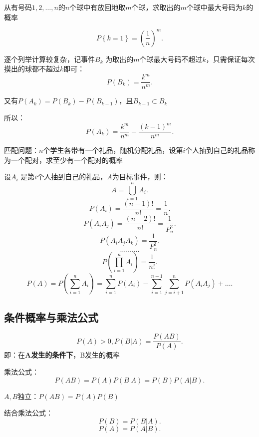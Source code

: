 \begin{eg}
    从有号码$1,2,\ldots,n$的$n$个球中有放回地取$m$个球，求取出的$m$个球中最大号码为$k$的概率

    \[
        P\left\{ k=1 \right\} =\left( \frac{1}{n} \right) ^m
    .\]  

    逐个列举计算较复杂，记事件$B_k$ 为取出的$m$个球最大号码不超过$k$，只需保证每次摸出的球都不超过$k$即可：
    \[
        P\left( B_{k} \right) =\frac{k^m}{n^m}
    .\] 

    又有$P\left( A_{k} \right) =P\left( B_{k} \right) -P\left( B_{k-1} \right) $，且$B_{k-1}\subset B_{k}$ 

    所以：\[
        P\left( A_k \right) =\frac{k^m}{n^m}-\frac{\left( k-1 \right) ^m}{n^m}
    .\] 
\end{eg}
 
\begin{eg}
    匹配问题：$n$个学生各带有一个礼品，随机分配礼品，设第$i$个人抽到自己的礼品称为一个配对，求至少有一个配对的概率

    设$A_{i}$ 是第$i$个人抽到自己的礼品，$A$为目标事件，则： \[
        A=\bigcup_{i=1}^{n}A_{i}
    .\] 
    \[
        P\left( A_{i} \right) =\frac{\left( n-1 \right) !}{n!}=\frac{1}{n}
    .\] 
    \[
        P\left( A_iA_j \right) =\frac{\left( n-2 \right) !}{n!}=\frac{1}{P_{n}^{2}}
    .\] 
    \[
        P\left( A_iA_jA_k \right) =\frac{1}{P_{n}^{3}}
    .\] 
    \[
        \ldots\ldots\ldots
    .\] 
    \[
        P\left( \prod_{i=1}^{n} A_i  \right) =\frac{1}{n!}
    .\] 
    \[
        P\left( A \right) =P\left( \sum_{i=1}^{n} A_{i} \right) = \sum_{i=1}^{n} P\left( A_{i} \right) -\sum_{i=1}^{n-1} \sum_{j=i+1}^{n} P\left( A_iA_j \right) +\ldots
    .\] 
\end{eg}
\subsection{条件概率与乘法公式}%
\label{sub:条件概率与乘法公式}
\begin{defi}
    \[
        P\left( A \right) >0,P\left( B | A \right) =\frac{P\left( AB \right) }{P\left( A \right) }
    .\] 
    即：在\textbf{A发生的条件下}，B发生的概率
\end{defi}
\begin{defi}
    乘法公式：\[
        P\left( AB \right) =P\left( A \right) P\left( B|A \right) =P\left( B \right) P\left( A|B \right) 
    .\] 
\end{defi}
\begin{notation}
    $A,B$独立：$P\left( AB \right) =P\left( A \right) P\left( B \right) $

    结合乘法公式：\[
        P\left( B \right) =P\left( B|A \right) 
    .\] 
    \[
        P\left( A \right) =P\left( A|B \right) 
    .\] 
\end{notation}
